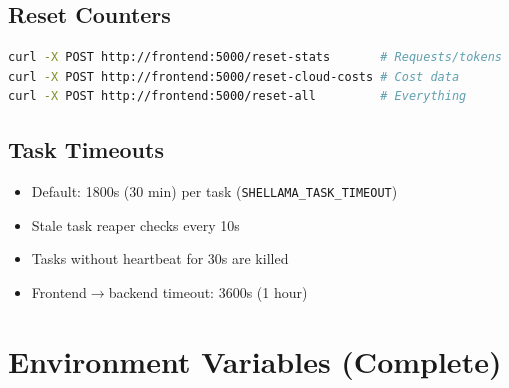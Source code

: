 \documentclass[11pt,a4paper]{article}
\begin{document}
\subsection{Reset Counters}
\begin{lstlisting}[language=bash]
curl -X POST http://frontend:5000/reset-stats       # Requests/tokens
curl -X POST http://frontend:5000/reset-cloud-costs # Cost data
curl -X POST http://frontend:5000/reset-all         # Everything
\end{lstlisting}

\subsection{Task Timeouts}
\begin{itemize}
  \item Default: 1800s (30 min) per task (\texttt{SHELLAMA\_TASK\_TIMEOUT})
  \item Stale task reaper checks every 10s
  \item Tasks without heartbeat for 30s are killed
  \item Frontend$\rightarrow$backend timeout: 3600s (1 hour)
\end{itemize}

\section{Environment Variables (Complete)}
\end{document}
